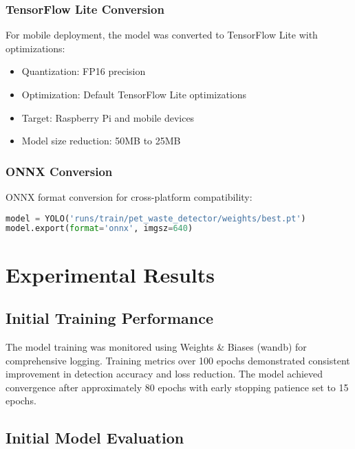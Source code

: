 \documentclass[12pt,a4paper]{article}
\begin{document}
\subsubsection{TensorFlow Lite Conversion}
For mobile deployment, the model was converted to TensorFlow Lite with optimizations:
\begin{itemize}
    \item Quantization: FP16 precision
    \item Optimization: Default TensorFlow Lite optimizations
    \item Target: Raspberry Pi and mobile devices
    \item Model size reduction: 50MB to 25MB
\end{itemize}

\subsubsection{ONNX Conversion}
ONNX format conversion for cross-platform compatibility:
\begin{lstlisting}[language=Python, caption=ONNX Conversion]
model = YOLO('runs/train/pet_waste_detector/weights/best.pt')
model.export(format='onnx', imgsz=640)
\end{lstlisting}

\section{Experimental Results}

\subsection{Initial Training Performance}

The model training was monitored using Weights \& Biases (wandb) for comprehensive logging. Training metrics over 100 epochs demonstrated consistent improvement in detection accuracy and loss reduction. The model achieved convergence after approximately 80 epochs with early stopping patience set to 15 epochs.


\subsection{Initial Model Evaluation}
\end{document}
